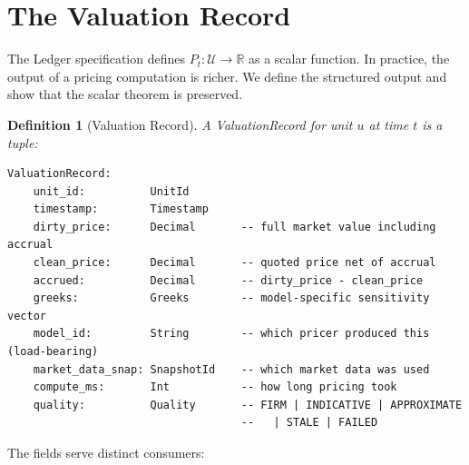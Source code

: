 \documentclass[11pt,a4paper]{article}
\newtheorem{definition}{Definition}[section]
\begin{document}
\clearpage
\section{The Valuation Record}
\label{sec:valuation-record}

The Ledger specification defines $P_t : \mathcal{U} \to \mathbb{R}$ as a scalar function.  In practice, the output of a pricing computation is richer.  We define the structured output and show that the scalar theorem is preserved.

\begin{definition}[Valuation Record]
\label{def:valuation-record}
A \emph{ValuationRecord} for unit $u$ at time $t$ is a tuple:
\begin{lstlisting}
ValuationRecord:
    unit_id:          UnitId
    timestamp:        Timestamp
    dirty_price:      Decimal       -- full market value including accrual
    clean_price:      Decimal       -- quoted price net of accrual
    accrued:          Decimal       -- dirty_price - clean_price
    greeks:           Greeks        -- model-specific sensitivity vector
    model_id:         String        -- which pricer produced this (load-bearing)
    market_data_snap: SnapshotId    -- which market data was used
    compute_ms:       Int           -- how long pricing took
    quality:          Quality       -- FIRM | INDICATIVE | APPROXIMATE
                                    --   | STALE | FAILED
\end{lstlisting}
\end{definition}

\noindent The fields serve distinct consumers:
\end{document}
